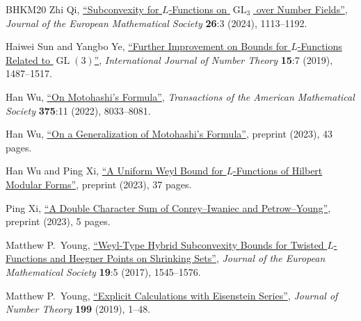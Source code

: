 \documentclass[11pt,a4paper]{amsart}
\DeclareMathOperator{\GL}{GL}
\numberwithin{equation}{section}
\theoremstyle{remark}
\theoremstyle{definition}
\begin{document}
\begin{thebibliography}{BHKM20}
 Zhi Qi, \href{https://doi.org/10.4171/jems/1306}{``Subconvexity for $L$-Functions on $\GL_3$ over Number Fields''}, \textit{Journal of the European Mathematical Society} \textbf{26}:3 (2024), 1113--1192.

 Haiwei Sun and Yangbo Ye, \href{https://doi.org/10.1142/S1793042119500866}{``Further Improvement on Bounds for $L$-Functions Related to $\GL(3)$''}, \textit{International Journal of Number Theory} \textbf{15}:7 (2019), 1487--1517.

 Han Wu, \href{https://doi.org/10.1090/tran/8750}{``On Motohashi's Formula''}, \textit{Transactions of the American Mathematical Society} \textbf{375}:11 (2022), 8033--8081.

 Han Wu, \href{https://arxiv.org/abs/2310.08236v4}{``On a Generalization of Motohashi's Formula''}, preprint (2023), 43 pages.

 Han Wu and Ping Xi, \href{https://arxiv.org/abs/2302.14652v2}{``A Uniform Weyl Bound for $L$-Functions of Hilbert Modular Forms''}, preprint (2023), 37 pages.

 Ping Xi, \href{https://arxiv.org/abs/2302.14681v1}{``A Double Character Sum of Conrey--Iwaniec and Petrow--Young''}, preprint (2023), 5 pages.

 Matthew P.~Young, \href{https://doi.org/10.4171/jems/699}{``Weyl-Type Hybrid Subconvexity Bounds for Twisted $L$-Functions and Heegner Points on Shrinking Sets''}, \textit{Journal of the European Mathematical Society} \textbf{19}:5 (2017), 1545--1576.

 Matthew P.~Young, \href{https://doi.org/10.1016/j.jnt.2018.11.007}{``Explicit Calculations with Eisenstein Series''}, \textit{Journal of Number Theory} \textbf{199} (2019), 1--48.

\end{thebibliography}
\end{document}
